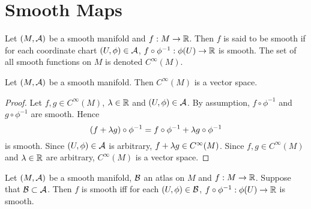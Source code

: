 \documentclass{book}
\begin{document}
	
	
	
	
	
	
	
	
	
	
	
	
	
	
	
	
	
	
	
	
	
	
	\newpage 
	\section{Smooth Maps}	
	
	\begin{defn} 
		Let $(M, \mathcal{A})$ be a smooth manifold and $f: M \rightarrow \mathbb{R}$. Then $f$ is said to be smooth if for each coordinate chart $(U, \phi) \in \mathcal{A}$, $f \circ \phi^{-1}: \phi(U) \rightarrow \mathbb{R}$ is smooth. The set of all smooth functions on $M$ is denoted $C^{\infty}(M)$. 
	\end{defn}

	\begin{ex} 
		Let $(M, \mathcal{A})$ be a smooth manifold. Then $C^{\infty}(M)$ is a vector space.
	\end{ex}

	\begin{proof}
		Let $f,g \in C^{\infty}(M)$, $\lambda \in \mathbb{R}$ and $(U, \phi) \in \mathcal{A}$. By assumption, $f \circ \phi^{-1}$ and $g \circ \phi^{-1}$ are smooth. Hence 
		$$(f + \lambda g) \circ \phi^{-1} = f \circ \phi^{-1} + \lambda g \circ \phi^{-1} $$
		is smooth. Since $(U, \phi) \in \mathcal{A}$ is arbitrary, $f + \lambda g \in C^{\infty}(M)$. Since $f,g \in C^{\infty}(M)$ and $\lambda \in \mathbb{R}$ are arbitrary, $C^{\infty}(M)$ is a vector space.
	\end{proof}

	\begin{ex}
		Let $(M, \mathcal{A})$ be a smooth manifold, $\mathcal{B}$ an atlas on $M$ and $f:M \rightarrow \mathbb{R}$. Suppose that $\mathcal{B} \subset \mathcal{A}$. Then $f$ is smooth iff for each $(U, \phi) \in \mathcal{B}$, $f \circ \phi^{-1}: \phi(U) \rightarrow \mathbb{R}$ is smooth.
	\end{ex}
\end{document}
